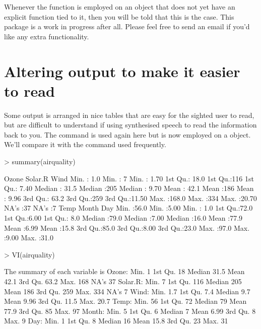 Whenever the  function is employed on an object that does not yet have an explicit function tied to it, then you will be told that this is the case. This package is a work in progress after all. Please feel free to send an email if you'd like any extra functionality.



\section{Altering \R{} output to make it easier to read}

Some \R{} output is arranged in nice tables that are easy for the sighted user to read, but are difficult to understand if using synthesised  speech to read the information back to you. The  command is used again here but is now employed on a  object. We'll compare it with the  command used frequently.
\begin{Schunk}
\begin{Sinput}
> summary(airquality)
\end{Sinput}
\begin{Soutput}
     Ozone          Solar.R         Wind      
 Min.   :  1.0   Min.   :  7   Min.   : 1.70  
 1st Qu.: 18.0   1st Qu.:116   1st Qu.: 7.40  
 Median : 31.5   Median :205   Median : 9.70  
 Mean   : 42.1   Mean   :186   Mean   : 9.96  
 3rd Qu.: 63.2   3rd Qu.:259   3rd Qu.:11.50  
 Max.   :168.0   Max.   :334   Max.   :20.70  
 NA's   :37      NA's   :7                    
      Temp          Month           Day      
 Min.   :56.0   Min.   :5.00   Min.   : 1.0  
 1st Qu.:72.0   1st Qu.:6.00   1st Qu.: 8.0  
 Median :79.0   Median :7.00   Median :16.0  
 Mean   :77.9   Mean   :6.99   Mean   :15.8  
 3rd Qu.:85.0   3rd Qu.:8.00   3rd Qu.:23.0  
 Max.   :97.0   Max.   :9.00   Max.   :31.0  
                                             
\end{Soutput}
\begin{Sinput}
> VI(airquality)
\end{Sinput}
\begin{Soutput}

The summary of each variable is
Ozone: Min. 1   1st Qu. 18   Median 31.5   Mean 42.1   3rd Qu. 63.2   Max. 168   NA's 37  
Solar.R: Min. 7   1st Qu. 116   Median 205   Mean 186   3rd Qu. 259   Max. 334   NA's 7  
Wind: Min. 1.7   1st Qu. 7.4   Median 9.7   Mean 9.96   3rd Qu. 11.5   Max. 20.7  
Temp: Min. 56   1st Qu. 72   Median 79   Mean 77.9   3rd Qu. 85   Max. 97  
Month: Min. 5   1st Qu. 6   Median 7   Mean 6.99   3rd Qu. 8   Max. 9  
Day: Min. 1   1st Qu. 8   Median 16   Mean 15.8   3rd Qu. 23   Max. 31  
\end{Soutput}
\end{Schunk}

